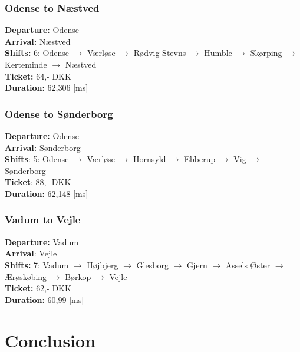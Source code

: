 \subsubsection{Odense to Næstved}
\textbf{Departure:} Odense \\
\textbf{Arrival:}   Næstved \\
\textbf{Shifts:}    6: Odense $\rightarrow$ Værløse $\rightarrow$ Rødvig Stevns $\rightarrow$ Humble $\rightarrow$ Skørping $\rightarrow$ Kerteminde $\rightarrow$ Næstved\\
\textbf{Ticket:}    64,- DKK \\
\textbf{Duration:}  62,306 [ms] 
\subsubsection{Odense to Sønderborg}
\textbf{Departure:} Odense \\
\textbf{Arrival: }  Sønderborg \\ 
\textbf{Shifts}:    5: Odense $\rightarrow$ Værløse $\rightarrow$ Hornsyld $\rightarrow$ Ebberup $\rightarrow$ Vig $\rightarrow$ Sønderborg \\
\textbf{Ticket}:    88,- DKK \\
\textbf{Duration:}  62,148 [ms]
\subsubsection{Vadum to Vejle}
\textbf{Departure:} Vadum\\
\textbf{Arrival}:   Vejle\\
\textbf{Shifts:}    7: Vadum $\rightarrow$ Højbjerg $\rightarrow$ Glesborg $\rightarrow$ Gjern $\rightarrow$ Assels Øster $\rightarrow$ Ærøskøbing $\rightarrow$ Børkop $\rightarrow$ Vejle \\
\textbf{Ticket:}    62,- DKK \\
\textbf{Duration:}  60,99 [ms]



\section{Conclusion}


